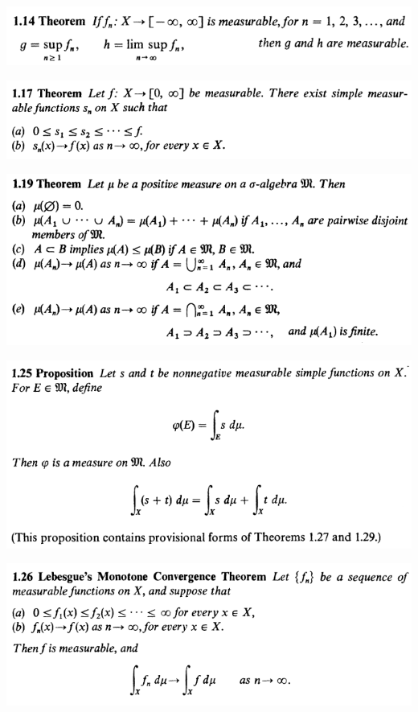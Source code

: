 \documentclass[12pt]{article}
\begin{document}
		\begin{center}
		\includegraphics{1ponto14}
		\end{center}

		\begin{center}
		\includegraphics{1ponto17}
		\end{center}

		\begin{center}
		\includegraphics{1ponto19}
		\end{center}

		\begin{center}
		\includegraphics{1ponto25}
		\end{center}

		\begin{center}
		\includegraphics{1ponto26}
		\end{center}
\end{document}
